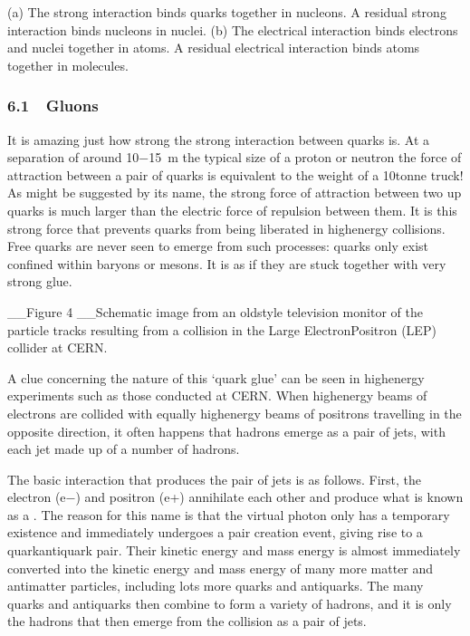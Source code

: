 \documentclass[letterpaper,10pt,english]{sphinxmanual}
\let\sphinxpxdimen\pdfpxdimen\else\newdimen\sphinxpxdimen
\begin{document}
\sphinxincludegraphics[width=488\sphinxpxdimen,height=256\sphinxpxdimen]{{sm123_t06_p03_f02_kb.eps}.jpg}

 (a) The strong interaction binds quarks together in nucleons. A residual strong interaction binds nucleons in nuclei. (b) The electrical interaction binds electrons and nuclei together in atoms. A residual electrical interaction binds atoms together in molecules.


\subsubsection{6.1  Gluons}
\label{\detokenize{content/session_00/Part_00_06:6.1_xa0_xa0Gluons}}
It is amazing just how strong the strong interaction between quarks is. At a separation of around 10−15 m \textendash{} the typical size of a proton or neutron \textendash{} the force of attraction between a pair of quarks is equivalent to the weight of a 10\sphinxhyphen{}tonne truck! As might be suggested by its name, the strong force of attraction between two up quarks is much larger than the electric force of repulsion between them. It is this strong force that prevents quarks from being liberated in high\sphinxhyphen{}energy collisions. Free
quarks are never seen to emerge from such processes: quarks only exist confined within baryons or mesons. It is as if they are stuck together with very strong glue.

\sphinxincludegraphics[width=512\sphinxpxdimen,height=512\sphinxpxdimen]{{sm123_t06_p03_f03.tif}.jpg}

\_\_Figure 4 \_\_Schematic image from an old\sphinxhyphen{}style television monitor of the particle tracks resulting from a collision in the Large Electron\textendash{}Positron (LEP) collider at CERN.

A clue concerning the nature of this ‘quark glue’ can be seen in high\sphinxhyphen{}energy experiments such as those conducted at CERN. When high\sphinxhyphen{}energy beams of electrons are collided with equally high\sphinxhyphen{}energy beams of positrons travelling in the opposite direction, it often happens that hadrons emerge as a pair of jets, with each jet made up of a number of hadrons.

The basic interaction that produces the pair of jets is as follows. First, the electron (e−) and positron (e+) annihilate each other and produce what is known as a . The reason for this name is that the virtual photon only has a temporary existence and immediately undergoes a pair creation event, giving rise to a quark\textendash{}antiquark pair. Their kinetic energy and mass energy is almost immediately converted into the kinetic energy and mass energy of many more matter and antimatter
particles, including lots more quarks and antiquarks. The many quarks and antiquarks then combine to form a variety of hadrons, and it is only the hadrons that then emerge from the collision as a pair of jets.
\end{document}
